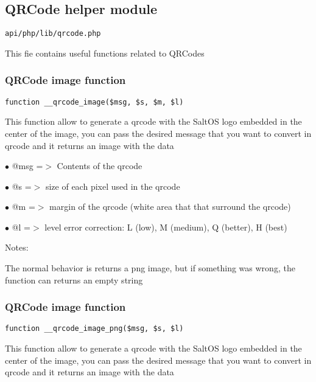 \documentclass[a4paper]{article}
\begin{document}
\hypertarget{toc519}{}
\subsection{QRCode helper module}

\begin{lstlisting}
api/php/lib/qrcode.php
\end{lstlisting}

This fie contains useful functions related to QRCodes

\hypertarget{toc520}{}
\subsubsection{QRCode image function}

\begin{lstlisting}
function __qrcode_image($msg, $s, $m, $l)
\end{lstlisting}

This function allow to generate a qrcode with the SaltOS logo embedded
in the center of the image, you can pass the desired message that you
want to convert in qrcode and it returns an image with the data

\begin{compactitem}
\item[\color{myblue}$\bullet$] @msg =$>$ Contents of the qrcode
\item[\color{myblue}$\bullet$] @s   =$>$ size of each pixel used in the qrcode
\item[\color{myblue}$\bullet$] @m   =$>$ margin of the qrcode (white area that that surround the qrcode)
\item[\color{myblue}$\bullet$] @l   =$>$ level error correction: L (low), M (medium), Q (better), H (best)
\end{compactitem}

Notes:

The normal behavior is returns a png image, but if something was wrong,
the function can returns an empty string

\hypertarget{toc521}{}
\subsubsection{QRCode image function}

\begin{lstlisting}
function __qrcode_image_png($msg, $s, $l)
\end{lstlisting}

This function allow to generate a qrcode with the SaltOS logo embedded
in the center of the image, you can pass the desired message that you
want to convert in qrcode and it returns an image with the data
\end{document}
